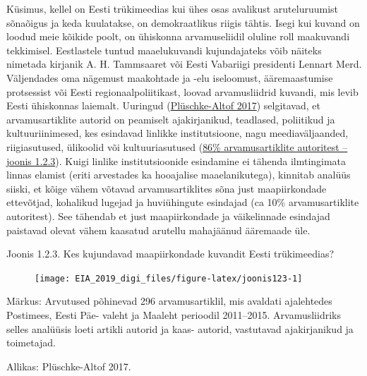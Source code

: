 \documentclass[estonian,]{article}
\begin{document}
Küsimus, kellel on Eesti trükimeedias kui ühes osas avalikust aruteluruumist sõnaõigus ja keda kuulatakse, on demokraatlikus riigis tähtis. Isegi kui kuvand on loodud meie kõikide poolt, on ühiskonna arvamuseliidil oluline roll maakuvandi tekkimisel. Eestlastele tuntud maaelukuvandi kujundajateks võib näiteks nimetada kirjanik A. H. Tammsaaret või Eesti Vabariigi presidenti Lennart Merd. Väljendades oma nägemust maakohtade ja -elu iseloomust, ääremaastumise protsessist või Eesti regionaalpoliitikast, loovad arvamusliidrid kuvandi, mis levib Eesti ühiskonnas laiemalt. Uuringud (\protect\hyperlink{Pluxfcschke-Altof2017}{Plüschke-Altof 2017}) selgitavad, et arvamusartiklite autorid on peamiselt ajakirjanikud, teadlased, poliitikud ja kultuuriinimesed, kes esindavad linlikke institutsioone, nagu meediaväljaanded, riigiasutused, ülikoolid või kultuuriasutused (\protect\hyperlink{figure123}{86\% arvamusartiklite autoritest -- joonis 1.2.3}). Kuigi linlike institutsioonide esindamine ei tähenda ilmtingimata linnas elamist (eriti arvestades ka hooajalise maaelanikutega), kinnitab analüüs siiski, et kõige vähem võtavad arvamusartiklites sõna just maapiirkondade ettevõtjad, kohalikud lugejad ja huviühingute esindajad (ca 10\% arvamusartiklite autoritest). See tähendab et just maapiirkondade ja väikelinnade esindajad paistavad olevat vähem kaasatud arutellu mahajäänud ääremaade üle.

{Joonis 1.2.3.} Kes kujundavad maapiirkondade kuvandit Eesti trükimeedias?

\begin{figure}

{\centering \texttt{[image: EIA\_2019\_digi\_files/figure-latex/joonis123-1]} 

}

\end{figure}

\begin{figure-comment}
{Märkus:} Arvutused põhinevad 296 arvamusartiklil, mis avaldati
ajalehtedes Postimees, Eesti Päe- valeht ja Maaleht perioodil
2011--2015. Arvamusliidriks selles analüüsis loeti artikli autorid ja
kaas- autorid, vastutavad ajakirjanikud ja toimetajad.
\end{figure-comment}

\begin{imgsource}
{Allikas:} Plüschke-Altof 2017.
\end{imgsource}
\end{document}
